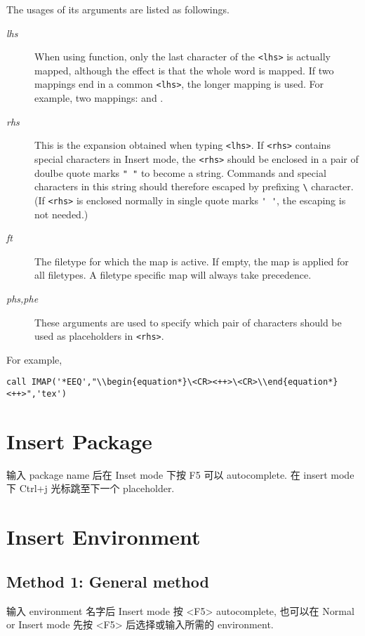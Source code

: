 \documentclass{article}
\newcommand{\syntax}[1]{\PVerb{#1}}
\begin{document}
The usages of its arguments are listed as followings.
\begin{description}
  \item[\textit{lhs}] When using \syntax{IMAP} function, only the last character of the \lstinline|<lhs>| is actually mapped, although the effect is that the whole word is mapped. If two mappings end in a common \lstinline|<lhs>|, the longer mapping is used. For example, two mappings: \syntax{BarFoo} and \syntax{Foo}.
  \item[\textit{rhs}] This is the expansion obtained when typing \lstinline|<lhs>|. If \lstinline|<rhs>| contains special characters in Insert mode, the \lstinline|<rhs>| should be enclosed in a pair of doulbe quote marks \verb|" "| to become a string. Commands and special characters in this string should therefore escaped by prefixing \verb|\| character. (If \lstinline|<rhs>| is enclosed normally in single quote marks \verb|' '|, the escaping is not needed.)
  \item[\textit{ft}] The filetype for which the map is active. If empty, the map is applied for all filetypes. A filetype specific map will always take precedence.
  \item[\textit{phs,phe}] These arguments are used to specify which pair of characters should be used as placeholders in \lstinline|<rhs>|.
\end{description}

For example,
\begin{lstlisting}[breaklines=true,deletecomment={[s]{<}{>}}]
call IMAP('*EEQ',"\\begin{equation*}\<CR><++>\<CR>\\end{equation*}<++>",'tex')
\end{lstlisting}

\section{Insert Package}
输入 package name 后在 Inset mode 下按 F5 可以 autocomplete. 在 insert mode 下 Ctrl+j 光标跳至下一个 placeholder.
\section{Insert Environment} 
\subsection{Method 1: General method}
输入 environment 名字后 Insert mode 按 <F5> autocomplete, 也可以在 Normal or Insert mode 先按 <F5> 后选择或输入所需的 environment.
\end{document}
